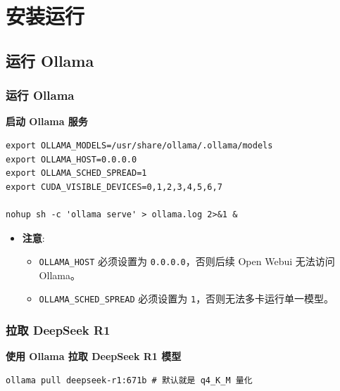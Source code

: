 \section{安装运行}

\subsection{运行 Ollama}

\begin{frame}[fragile]
\frametitle{运行 Ollama}
\textbf{启动 Ollama 服务}
\begin{lstlisting}
export OLLAMA_MODELS=/usr/share/ollama/.ollama/models
export OLLAMA_HOST=0.0.0.0
export OLLAMA_SCHED_SPREAD=1
export CUDA_VISIBLE_DEVICES=0,1,2,3,4,5,6,7

nohup sh -c 'ollama serve' > ollama.log 2>&1 &
\end{lstlisting}
\begin{itemize}
    \item \textbf{注意}:
    \begin{itemize}
        \item \texttt{OLLAMA\_HOST} 必须设置为 \texttt{0.0.0.0}，否则后续 Open Webui 无法访问 Ollama。
        \item \texttt{OLLAMA\_SCHED\_SPREAD} 必须设置为 \texttt{1}，否则无法多卡运行单一模型。
    \end{itemize}
\end{itemize}
\end{frame}

\begin{frame}[fragile]
\frametitle{拉取 DeepSeek R1}
\textbf{使用 Ollama 拉取 DeepSeek R1 模型}
\begin{lstlisting}
ollama pull deepseek-r1:671b # 默认就是 q4_K_M 量化
\end{lstlisting}
\end{frame}

